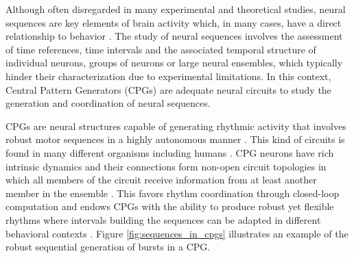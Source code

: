 Although often disregarded in many experimental and theoretical studies, neural sequences are key elements of brain activity which, in many cases, have a direct relationship to behavior \parencite{hahnloser_ultrasparse_2002,venaille_synchronization_2005,buzsaki_space_2018,rabinovich_discrete_2018,paton_neural_2018,elices_robust_2019}.
The study of neural sequences involves the assessment of time references, time intervals and the associated temporal structure of individual neurons, groups of neurons or large neural ensembles, which typically hinder their characterization due to experimental limitations. In this context, Central Pattern Generators (CPGs) are adequate neural circuits to study the generation and coordination of neural sequences. 

CPGs are neural structures capable of generating rhythmic activity that involves robust motor sequences in a highly autonomous manner \parencite{hartline_mottor_1976,selverston_reliable_2000,marder_central_2001}. This kind of circuits is found in many different organisms including humans \parencite{dimitrijevic_evidence_1998,pavlidis_neonatal_2016, arichi_localization_2017}. CPG neurons have rich intrinsic dynamics and their connections form non-open circuit topologies in which all members of the circuit receive information from at least another member in the ensemble \parencite{selverston_reliable_2000,huerta_topology_2001}. This favors rhythm coordination through closed-loop computation and endows CPGs with the ability to produce robust yet flexible rhythms where intervals building the sequences can be adapted in different behavioral contexts \parencite{elices_robust_2019}. %
Figure  \ref{fig:sequences_in_cpgs} illustrates an example of the robust sequential generation of bursts in a CPG. 

